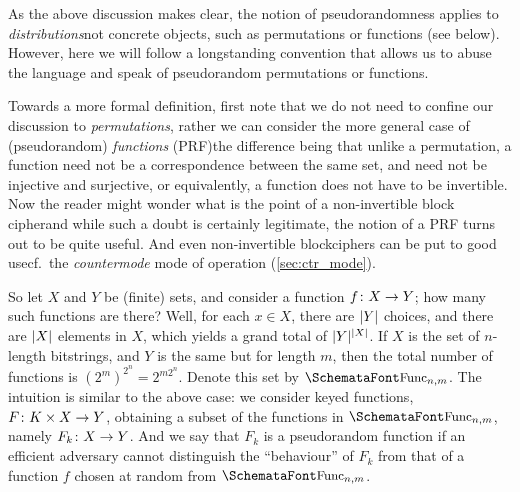   \begin{remark}
    \label{rem:pseudorandom_dist}
    As the above discussion makes clear, the notion of pseudorandomness applies to \emph{distributions}\emd not concrete objects, such as permutations or functions (see below). However, here we will follow a longstanding convention that allows us to abuse the language and speak of pseudorandom permutations or functions.
  \end{remark}

  \bigskip

  \noindent Towards a more formal definition, first note that we do not need to confine our discussion to \emph{permutations}, rather we can consider the more general case of (pseudorandom) \emph{functions} (PRF)\emd the difference being that unlike a permutation, a function need not be a correspondence between the same set, and need not be injective and surjective, or equivalently, a function does not have to be invertible. Now the reader might wonder what is the point of a non-invertible block cipher\emd and while such a doubt is certainly legitimate, the notion of a PRF turns out to be quite useful. And even non-invertible blockciphers can be put to good use\emd cf.\ the \emph{countermode} mode of operation (\ts\ref{sec:ctr_mode}).

  So let $X$ and $Y$ be (finite) sets, and consider a function $f\colon X \rightarrow Y$; how many such functions are there? Well, for each $x\in X$, there are $\lvert Y\rvert$ choices, and there are $\lvert X\rvert$ elements in $X$, which yields a grand total of $\lvert Y\rvert^{\lvert X\rvert}$. If $X$ is the set of $n$-length bitstrings, and $Y$ is the same but for length $m$, then the total number of functions is $(2^m)^{2^n} = 2^{m2^n}$. Denote this set by $\sgg{Func}_{n, m}$. The intuition is similar to the above case: we consider keyed functions, $F\colon K\times X \rightarrow Y$, obtaining a subset of the functions in $\sgg{Func}_{n, m}$, namely $F_k\colon X \rightarrow Y$. And we say that $F_k$ is a pseudorandom function if an efficient adversary cannot distinguish the ``behaviour'' of $F_k$ from that of a function $f$ chosen at random from $\sgg{Func}_{n, m}$.

